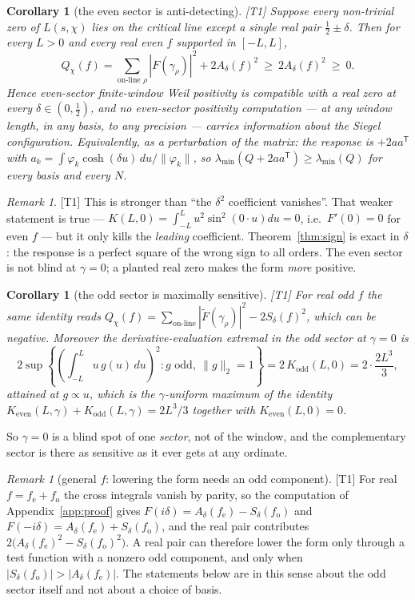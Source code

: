 \documentclass[11pt,a4paper]{article}
\newtheorem{corollary}[theorem]{Corollary}
\theoremstyle{remark}
\newtheorem{remark}[theorem]{Remark}
\newcommand{\tier}[1]{{\small\textsf{[#1]}}}
\newcommand{\Ad}{A_\delta}
\newcommand{\Sd}{S_\delta}
\begin{document}
\begin{corollary}[the even sector is anti-detecting]\label{cor:even}\tier{T1}
Suppose every non-trivial zero of $L(s,\chi)$ lies on the critical line except a single
real pair $\tfrac12\pm\delta$. Then for every $L>0$ and every real even $f$ supported in
$[-L,L]$,
\[
Q_\chi(f)=\sum_{\text{on-line }\rho}|F(\gamma_\rho)|^2+2\Ad(f)^2\ \ge\ 2\Ad(f)^2\ \ge\ 0 .
\]
Hence even-sector finite-window Weil positivity is compatible with a real zero at every
$\delta\in(0,\tfrac12)$, and no even-sector positivity computation --- at any window
length, in any basis, to any precision --- carries information about the Siegel
configuration. Equivalently, as a perturbation of the matrix: the response is $+2aa^{\mathsf T}$
with $a_k=\int\varphi_k\cosh(\delta u)\,du/\|\varphi_k\|$, so
$\lambda_{\min}(Q+2aa^{\mathsf T})\ge\lambda_{\min}(Q)$ for every basis and every $N$.
\end{corollary}

\begin{remark}\tier{T1}
This is stronger than ``the $\delta^2$ coefficient vanishes''. That weaker statement is
true --- $K(L,0)=\int_{-L}^{L}u^2\sin^2(0\cdot u)du=0$, i.e.\ $F'(0)=0$ for even $f$ ---
but it only kills the \emph{leading} coefficient. Theorem~\ref{thm:sign} is exact in
$\delta$: the response is a perfect square of the wrong sign to all orders. The even
sector is not blind at $\gamma=0$; a planted real zero makes the form \emph{more} positive.
\end{remark}

\begin{corollary}[the odd sector is maximally sensitive]\label{cor:odd}\tier{T1}
For real odd $f$ the same identity reads
$Q_\chi(f)=\sum_{\text{on-line}}|\widetilde F(\gamma_\rho)|^2-2\Sd(f)^2$, which can be
negative. Moreover the derivative-evaluation extremal in the odd sector at $\gamma=0$ is
\[
2\sup\left\{\left(\int_{-L}^{L} u\,g(u)\,du\right)^{\!2} : g \text{ odd},\ \|g\|_2=1\right\}
=2\,K_{\mathrm{odd}}(L,0)=2\cdot\frac{2L^3}{3},
\]
attained at $g\propto u$, which is the $\gamma$-uniform \emph{maximum} of the identity
$K_{\mathrm{even}}(L,\gamma)+K_{\mathrm{odd}}(L,\gamma)=2L^3/3$ together with
$K_{\mathrm{even}}(L,0)=0$.
\end{corollary}

So $\gamma=0$ is a blind spot of one \emph{sector}, not of the window, and the
complementary sector is there as sensitive as it ever gets at any ordinate.

\begin{remark}[general $f$: lowering the form needs an odd component]\label{rem:mixed}
\tier{T1} For real $f=f_{\mathrm{e}}+f_{\mathrm{o}}$ the cross integrals vanish by parity,
so the computation of Appendix~\ref{app:proof} gives
$F(i\delta)=\Ad(f_{\mathrm{e}})-\Sd(f_{\mathrm{o}})$ and
$F(-i\delta)=\Ad(f_{\mathrm{e}})+\Sd(f_{\mathrm{o}})$, and the real pair contributes
$2\bigl(\Ad(f_{\mathrm{e}})^2-\Sd(f_{\mathrm{o}})^2\bigr)$. A real pair can therefore lower
the form only through a test function with a nonzero odd component, and only when
$|\Sd(f_{\mathrm{o}})|>|\Ad(f_{\mathrm{e}})|$. The statements below are in this sense about
the odd sector itself and not about a choice of basis.
\end{remark}
\end{document}
